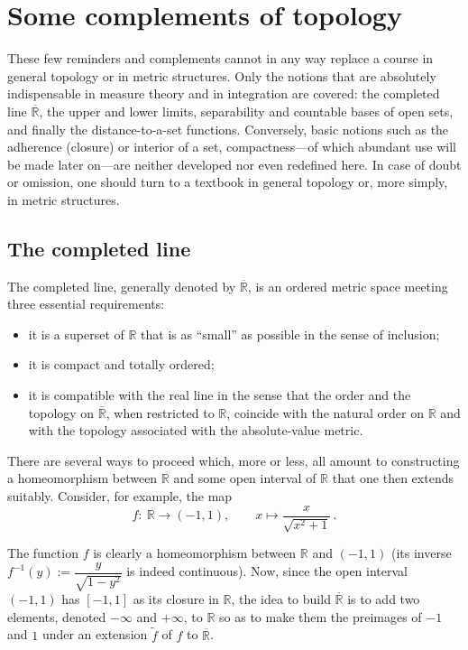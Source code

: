 \documentclass[12pt]{article}
\theoremstyle{definition}
\begin{document}
\newpage
\section{Some complements of topology}

These few reminders and complements cannot in any way replace a course in general topology or in metric structures.
Only the notions that are absolutely indispensable in measure theory and in integration are covered:
the completed line $\overline{\mathbb{R}}$, the upper and lower limits, separability and countable bases of open sets, and finally the distance-to-a-set functions.
Conversely, basic notions such as the adherence (closure) or interior of a set, compactness—of which abundant use will be made later on—are neither developed nor even redefined here.
In case of doubt or omission, one should turn to a textbook in general topology or, more simply, in metric structures.

\subsection{The completed line}

The completed line, generally denoted by $\overline{\mathbb{R}}$, is an ordered metric space meeting three essential requirements:
\begin{itemize}[leftmargin=1.5em]
\item it is a superset of $\mathbb{R}$ that is as ``small'' as possible in the sense of inclusion;
\item it is compact and totally ordered;
\item it is compatible with the real line in the sense that the order and the topology on $\overline{\mathbb{R}}$, when restricted to $\mathbb{R}$, coincide with the natural order on $\mathbb{R}$ and with the topology associated with the absolute-value metric.
\end{itemize}

There are several ways to proceed which, more or less, all amount to constructing a homeomorphism between $\mathbb{R}$ and some open interval of $\mathbb{R}$ that one then extends suitably.
Consider, for example, the map
\[
f:\ \mathbb{R}\longrightarrow (-1,1),\qquad
x\longmapsto \frac{x}{\sqrt{x^2+1}}\, .
\]

The function $f$ is clearly a homeomorphism between $\mathbb{R}$ and $(-1,1)$ (its inverse
$f^{-1}(y):=\dfrac{y}{\sqrt{1-y^2}}$ is indeed continuous).
Now, since the open interval $(-1,1)$ has $[-1,1]$ as its closure in $\mathbb{R}$, the idea to build $\overline{\mathbb{R}}$ is to add two elements, denoted $-\infty$ and $+\infty$, to $\mathbb{R}$ so as to make them the preimages of $-1$ and $1$ under an extension $\tilde f$ of $f$ to $\overline{\mathbb{R}}$.
\end{document}
